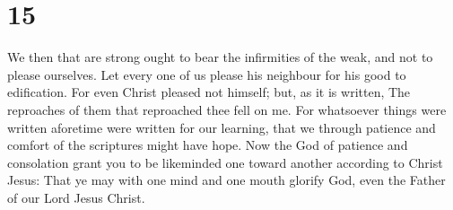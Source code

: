 \hypertarget{section-14}{%
\section{15}\label{section-14}}

 We then that are strong ought to bear the infirmities of
the weak, and not to please ourselves.  Let every one of
us please his neighbour for his good to edification.  For
even Christ pleased not himself; but, as it is written, The reproaches
of them that reproached thee fell on me.  For whatsoever
things were written aforetime were written for our learning, that we
through patience and comfort of the scriptures might have hope.
 Now the God of patience and consolation grant you to be
likeminded one toward another according to Christ Jesus: 
That ye may with one mind and one mouth glorify God, even the Father of
our Lord Jesus Christ.

